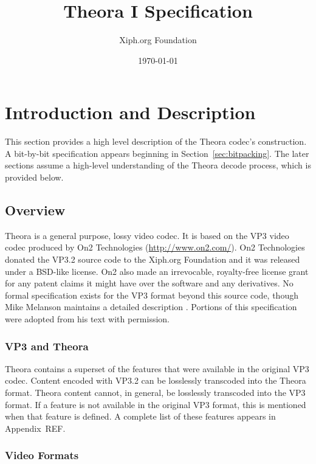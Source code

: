 \documentclass[11pt,letterpaper]{article}
\title{Theora I Specification}
\author{Xiph.org Foundation}
\date{\today}
\begin{document}
\maketitle
\tableofcontents
\newpage

\section{Introduction and Description}

This section provides a high level description of the Theora codec's
 construction.
A bit-by-bit specification appears beginning in Section~\ref{sec:bitpacking}.
The later sections assume a high-level understanding of the Theora decode
 process, which is provided below.

\subsection{Overview}

Theora is a general purpose, lossy video codec.
It is based on the VP3 video codec produced by On2 Technologies
 (\url{http://www.on2.com/}).
On2 Technologies donated the VP3.2 source code to the Xiph.org
 Foundation and it was released under a BSD-like license.
On2 also made an irrevocable, royalty-free license grant for any patent claims
 it might have over the software and any derivatives.
No formal specification exists for the VP3 format beyond this source code,
 though Mike Melanson maintains a detailed description \cite{Mel04}.
Portions of this specification were adopted from his text with permission.

\subsubsection{VP3 and Theora}

Theora contains a superset of the features that were available in the original
 VP3 codec.
Content encoded with VP3.2 can be losslessly transcoded into the Theora format.
Theora content cannot, in general, be losslessly transcoded into the VP3
 format.
If a feature is not available in the original VP3 format, this is mentioned
 when that feature is defined.
A complete list of these features appears in Appendix~REF.

\subsubsection{Video Formats}
\end{document}
